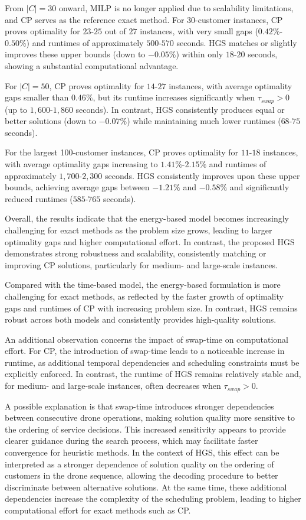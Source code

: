 \documentclass[3p, authoryear, 11pt]{elsarticle}
\begin{document}
From $|C|=30$ onward, MILP is no longer applied due to scalability limitations, and CP serves as the reference exact method. 
For 30-customer instances, CP proves optimality for $23$-$25$ out of $27$ instances, with very small gaps ($0.42\%$-$0.50\%$) and runtimes of approximately $500$-$570$ seconds. 
HGS matches or slightly improves these upper bounds (down to $-0.05\%$) within only $18$-$20$ seconds, showing a substantial computational advantage.

For $|C|=50$, CP proves optimality for $14$-$27$ instances, with average optimality gaps smaller than $0.46\%$, but its runtime increases significantly when $\tau_{swap} > 0$ (up to $1,600$-$1,860$ seconds). In contrast, HGS consistently produces equal or better solutions (down to $-0.07\%$) while maintaining much lower runtimes ($68$-$75$ seconds).

For the largest 100-customer instances, CP proves optimality for $11$-$18$ instances, with average optimality gaps increasing to $1.41\%$-$2.15\%$ and runtimes of approximately $1,700$-$2,300$ seconds. 
HGS consistently improves upon these upper bounds, achieving average gaps between $-1.21\%$ and $-0.58\%$ and significantly reduced runtimes ($585$-$765$ seconds).

Overall, the results indicate that the energy-based model becomes increasingly challenging for exact methods as the problem size grows, leading to larger optimality gaps and higher computational effort. In contrast, the proposed HGS demonstrates strong robustness and scalability, consistently matching or improving CP solutions, particularly for medium- and large-scale instances.

Compared with the time-based model, the energy-based formulation is more challenging for exact methods, as reflected by the faster growth of optimality gaps and runtimes of CP with increasing problem size. In contrast, HGS remains robust across both models and consistently provides high-quality solutions.

An additional observation concerns the impact of swap-time on computational effort.
For CP, the introduction of swap-time leads to a noticeable increase in runtime, as additional temporal dependencies and scheduling constraints must be explicitly enforced.
In contrast, the runtime of HGS remains relatively stable and, for medium- and large-scale instances, often decreases when $\tau_{swap} > 0$.

A possible explanation is that swap-time introduces stronger dependencies between consecutive drone operations, making solution quality more sensitive to the ordering of service decisions.
This increased sensitivity appears to provide clearer guidance during the search process, which may facilitate faster convergence for heuristic methods. In the context of HGS, this effect can be interpreted as a stronger dependence of solution quality on the ordering of customers in the drone sequence, allowing the decoding procedure to better discriminate between alternative solutions.
At the same time, these additional dependencies increase the complexity of the scheduling problem, leading to higher computational effort for exact methods such as CP.
\end{document}
